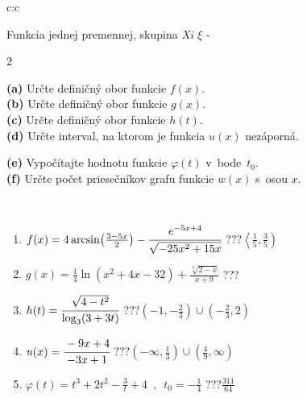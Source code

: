 \documentclass[10pt]{report}
\begin{document}
\begin{tabular}{c:c}
\begin{minipage}[c][104.5mm][t]{0.5\linewidth}
\begin{center}
\vspace{7mm}
{\huge Funkcia jednej premennej, skupina \textit{Xi $\xi$} -}\\[5mm]
\begin{minipage}{0.95\linewidth}
\begin{center}
{\small \begin{multicols}{2} \raggedright
\textbf{(a)} Určte definičný obor funkcie \(f(x)\). \\[1mm]
\textbf{(b)} Určte definičný obor funkcie \(g(x)\). \\[1mm]
\textbf{(c)} Určte definičný obor funkcie \(h(t)\). \\[1mm]
\textbf{(d)} Určte interval, na ktorom je funkcia \(u(x)\) nezáporná. \par \columnbreak
\textbf{(e)} Vypočítajte hodnotu funkcie \(\varphi(t)\) v~bode~\(t_0\). \\[1mm]
\textbf{(f)} Určte počet priesečníkov grafu funkcie \(w(x)\) s~osou \(x\). \\[1mm]
\end{multicols}
}
\end{center}
\end{minipage}
\\[4mm]
\begin{minipage}{0.79\linewidth}
\begin{center}
\begin{varwidth}{\linewidth}
\begin{enumerate}
\small
\item $f(x) = 4\arcsin\!\left( \frac{3-5x}{2} \right) - \cfrac{e^{-5x+4}}{\sqrt{-25x^2+15x}}$\quad \dotfill\; ???\;\dotfill \quad $\left\langle\frac{1}{5} , \frac{3}{5}\right)$
\item $g(x) = \frac{1}{4} \ln{\!(x^2+4x-32)}+\frac{\sqrt[3]{2-x}}{x+9}$\quad \dotfill\; ???\;\dotfill {}
\item $h(t) = \cfrac{\sqrt{4-t^2}}{\log_3(3+3t)}$\quad \dotfill\; ???\;\dotfill \quad $\left(-1 , -\frac{2}{3}\right)\cup\left(-\frac{2}{3} , 2\right)$
\item $u(x) = \cfrac{-9x+4}{-3x+1}$\quad \dotfill\; ???\;\dotfill \quad $\left(-\infty , \frac{1}{3}\right)\cup\left(\frac{4}{9} , \infty\right)$
\item $\varphi(t) = t^3+2t^2-\frac{3}{t}+4 \enspace , \enspace t_0=-\frac{1}{4}$\quad \dotfill\; ???\;\dotfill \quad $\frac{311}{64}$

\end{enumerate}
\end{varwidth}
\end{center}
\end{minipage}
\end{center}
\end{minipage}
\end{tabular}
\end{document}
